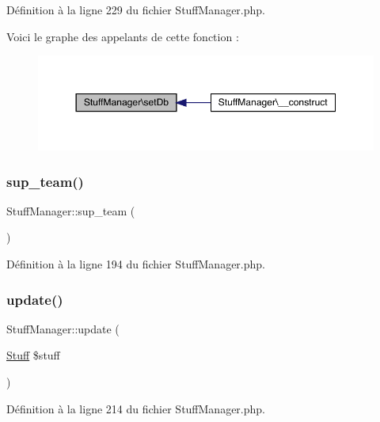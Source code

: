 Définition à la ligne 229 du fichier Stuff\+Manager.\+php.

Voici le graphe des appelants de cette fonction \+:\nopagebreak
\begin{figure}[H]
\begin{center}
\leavevmode
\includegraphics[width=350pt]{class_stuff_manager_a647de5fc08c6606300ca30937b7dde9e_icgraph}
\end{center}
\end{figure}
\mbox{\label{class_stuff_manager_a157cb09a4f11da9cbf2ddf552a73f1b9}} 
\subsubsection{\texorpdfstring{sup\+\_\+team()}{sup\_team()}}
{\footnotesize\ttfamily Stuff\+Manager\+::sup\+\_\+team (\begin{DoxyParamCaption}{ }\end{DoxyParamCaption})}



Définition à la ligne 194 du fichier Stuff\+Manager.\+php.

\mbox{\label{class_stuff_manager_a45dc81b0ddbbd804960d197d7a1cad69}} 
\subsubsection{\texorpdfstring{update()}{update()}}
{\footnotesize\ttfamily Stuff\+Manager\+::update (\begin{DoxyParamCaption}\item[{\mbox{\hyperlink{class_stuff}{Stuff}}}]{\$stuff }\end{DoxyParamCaption})}



Définition à la ligne 214 du fichier Stuff\+Manager.\+php.

